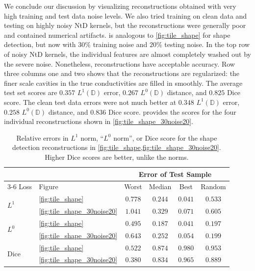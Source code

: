 \documentclass[pdflatex,sn-mathphys-num]{sn-jnl-preprint}
\newcommand{\D}{\mathbb{D}}
\theoremstyle{thmstyleone}%
\theoremstyle{thmstyletwo}%
\theoremstyle{thmstylethree}%
\numberwithin{equation}{section}
\numberwithin{theorem}{section}
\begin{document}
\begin{appendices}
We conclude our discussion by visualizing reconstructions obtained with very high training and test data noise levels. 
We also tried training on clean data and testing on highly noisy NtD kernels, but the reconstructions were generally poor and contained numerical artifacts.
 is analogous to \cref{fig:tile_shape} for shape detection, but now with $30\%$ training noise and $20\%$ testing noise. In the top row of noisy NtD kernels, the individual features are almost completely washed out by the severe noise. Nonetheless, reconstructions have acceptable accuracy. Row three columns one and two shows that the reconstructions are regularized: the finer scale cavities in the true conductivities are filled in smoothly. The average test set scores are $0.357$ $L^1(\D)$ error, $0.267$ $L^0(\D)$ distance, and $0.825$ Dice score. The clean test data errors were not much better at $0.348$ $L^1(\D)$ error, $0.258$ $L^0(\D)$ distance, and $0.836$ Dice score.  provides the scores for the four individual reconstructions shown in \cref{fig:tile_shape_30noise20}.

\begin{table}[tb]%
    \captionsetup{width=\textwidth,skip=10pt}
    \caption{Relative errors in $L^1$ norm, ``$L^0$ norm'', or Dice score for the shape detection reconstructions in \cref{fig:tile_shape,fig:tile_shape_30noise20}. Higher Dice scores are better, unlike the norms.}
    \label{tab:shape_scores_all}
    \centering
    \renewcommand{\arraystretch}{1.2}
    \begin{tabular}{llcccc}
        \toprule
        & & \multicolumn{4}{c}{Error of Test Sample} \\
        \cmidrule(l){3-6}
        Loss & Figure & Worst & Median & Best & Random \\
        \midrule
        \multirow{2}{*}{$L^1$} 
            & \cref{fig:tile_shape} &  $0.778$ & $0.244$ & $0.041$ & $0.533$\\
            & \cref{fig:tile_shape_30noise20} &  $1.041$ & $0.329$ & $0.071$ & $0.605$\\
        \midrule
        \multirow{2}{*}{$L^0$} 
            & \cref{fig:tile_shape} &  $0.495$   & $0.187$ & $0.041$ & $0.197$ \\
            & \cref{fig:tile_shape_30noise20} & $0.643$  & $0.252$& $0.054$ & $0.199$ \\
        \midrule
        \multirow{2}{*}{Dice} 
            & \cref{fig:tile_shape} &  $0.522$ & $0.874$ & $0.980$ & $0.953$\\
            & \cref{fig:tile_shape_30noise20} & $0.380$ & $0.834$ & $0.965$ & $0.889$ \\
        \bottomrule
    \end{tabular}
\end{table}


\end{appendices}
\end{document}
